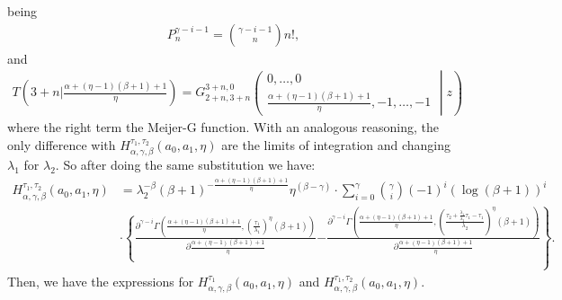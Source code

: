 \documentclass{article}
\begin{document}
being
\begin{align*}
P_n^{\gamma-i-1}=\binom{\gamma-i-1}{n} n!,
\end{align*}
and
\begin{align*}
T\left(3+n \big| \frac{\alpha+(\eta-1)(\beta+1)+1}{\eta}\right)=G_{2+n,3+n}^{3+n,0}\left( \begin{matrix} 0, \dots, 0 \\  \frac{\alpha+(\eta-1)(\beta+1)+1}{\eta},-1, \dots, -1 \end{matrix} \middle| z \right)
\end{align*}
where the right term the Meijer-G function.
With an analogous reasoning, the only difference with $H_{\alpha,\gamma,\beta}^{\tau_1,\tau_2}(a_0,a_1,\eta)$ are the limits of integration and changing $\lambda_1$ for $\lambda_2$. So after doing the same substitution we have:
\begin{align*}
H_{\alpha,\gamma,\beta}^{\tau_1,\tau_2}(a_0,a_1,\eta)&=\lambda_2^{-\beta}(\beta+1)^{-\frac{\alpha+(\eta-1)(\beta+1)+1}{\eta}}\eta^{(\beta-\gamma)} \cdot\sum_{i=0}^{\gamma}\binom{\gamma}{i}(-1)^{i}\left(\log\left(\beta+1\right)\right)^{i}
\\
 &\cdot \left\{\frac{\partial^{\gamma-i}\Gamma\left(\frac{\alpha+(\eta-1)(\beta+1)+1}{\eta},\left(\frac{\tau_1}{\lambda_1}\right)^{\eta}(\beta+1) \right)}{\partial  \frac{\alpha+(\eta-1)(\beta+1)+1}{\eta}}  \right.\left .-  \frac{\partial^{\gamma-i}\Gamma\left(\frac{\alpha+(\eta-1)(\beta+1)+1}{\eta},\left(\frac{\tau_2+\frac{\lambda_1}{\lambda_2}\tau_1-\tau_1}{\lambda_2}\right)^{\eta}(\beta+1) \right)}{\partial  \frac{\alpha+(\eta-1)(\beta+1)+1}{\eta}}   \right\}.
\end{align*}
Then, we have the expressions for  $H_{\alpha,\gamma,\beta}^{\tau_1}(a_0,a_1,\eta)$ and  $H_{\alpha,\gamma,\beta}^{\tau_1,\tau_2}(a_0,a_1,\eta)$.
\end{document}
